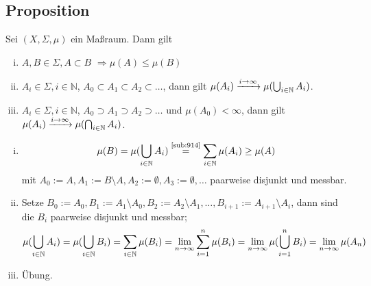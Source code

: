 \subsection[Proposition: Eigenschaften von Maßen]{Proposition} %
\label{sub:915}
Sei $(X,\Sigma, \mu)$ ein Maßraum. Dann gilt
\begin{enumerate}[(i)]
	\item $A,B \in \Sigma, A \subset B$ $\Longrightarrow \mu (A) \le \mu(B)$
	\item $A_i \in \Sigma, i \in \mathds{N}$, $A_0 \subset A_1 \subset A_2 \subset \ldots $, dann gilt $\mu (A_i) \xrightarrow{i \to \infty} \mu (\bigcup_{i \in \mathbb{N}} A_i) $.
	\item $A_i \in \Sigma, i\in \mathds{N}$, $A_0 \supset A_1 \supset A_2 \supset \ldots $ und $\mu(A_0) < \infty$, dann gilt $\mu (A_i) \xrightarrow{i \to \infty} \mu (\bigcap_{i \in \mathbb{N}} A_i) $.
\end{enumerate}
\begin{enumerate}[(i)]
	\item \[
		\mu (B) =\mu (\bigcup_{i \in \mathbb{N}} A_i)  \stackrel{\text{\ref{sub:914}}}{=} \sum_{i \in \mathbb{N}} \mu(A_i)  \ge \mu (A)
	\]
	mit $A_0 := A, A_1 := B \setminus A, A_2 := \emptyset, A_3 := \emptyset, \ldots $ paarweise disjunkt und messbar.
	\item Setze $B_0 := A_0, B_1 := A_1 \setminus A_0, B_2 := A_2 \setminus A_1, \ldots , B_{i+1} := A_{i+1} \setminus A_i$, dann sind die $B_i$ paarweise disjunkt und 
	messbar;
	\[
		\mu (\bigcup_{i \in \mathbb{N}} A_i) = \mu (\bigcup_{i \in \mathbb{N}} B_i) = \sum_{i \in \mathbb{N}} \mu(B_i) = \lim_{ n \to \infty} 
		\sum_{i=1}^{n} \mu(B_i) = \lim_{ n \to \infty} \mu (\bigcup_{i=1}^n B_i) = \lim_{ n \to \infty} \mu(A_n) 
	\]
	\item Übung. \bewende
\end{enumerate}

